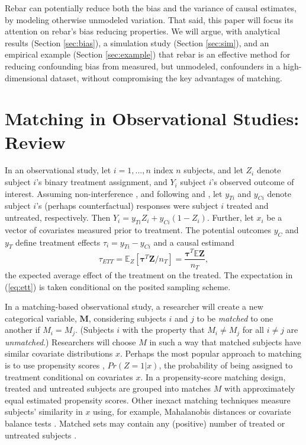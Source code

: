 \documentclass[12pt]{article}\usepackage[]{graphicx}\usepackage[]{color}
\newcommand{\yci}{y_{Ci}}
\newcommand{\yti}{y_{Ti}}
\newcommand{\EE}{\mathbb{E}}
\newcommand{\Match}{M}
\newcommand{\covVec}{x}
\begin{document}
Rebar can potentially reduce both the bias and the variance of causal estimates, by modeling otherwise unmodeled variation.
That said, this paper will focus its attention on rebar's bias reducing properties.
We will argue, with analytical results (Section \ref{sec:bias}), a simulation study (Section \ref{sec:sim}), and an empirical example (Section \ref{sec:example}) that rebar is an effective method for reducing confounding bias from measured, but unmodeled, confounders in a high-dimensional dataset, without compromising the key advantages of matching.



\section{Matching in Observational Studies: Review}\label{sec:matchingReview}

In an observational study, let $i=1,...,n$ index $n$ subjects, and let $Z_i$ denote subject $i$'s binary treatment assignment, and $Y_i$ subject $i$'s observed outcome of interest.
Assuming non-interference \citep{cox:1958}, and following \citet{neyman:1990} and \citet{rubin:1974}, let $y_{Ti}$ and $y_{Ci}$ denote subject $i$'s (perhaps counterfactual) responses were subject $i$ treated and untreated, respectively.
Then $Y_i=y_{Ti}Z_i+y_{Ci}(1-Z_i)$.
Further, let $\covVec_i$ be a vector of covariates measured prior to treatment.
The potential outcomes $y_C$ and $y_T$ define treatment effects $\tau_i=\yti-\yci$ and a causal estimand
\begin{equation}\label{eq:ett}
\tau_{ETT}=\EE_Z[\bm{\tau}^T\bm{Z}/n_T]=\frac{\bm{\tau}^T\EE\bm{Z}}{n_T},
\end{equation}
the expected average effect of the treatment on the treated.
The expectation in (\ref{eq:ett}) is taken conditional on the posited sampling scheme.

In a matching-based observational study, a researcher will create a
new categorical variable, $\mathbf{\Match}$, considering subjects $i$
and $j$ to be \emph{matched} %
to one another if $\Match_i=\Match_j$.
(Subjects $i$ with the property that $M_i \neq M_j$ for all $i\neq j$ are \textit{unmatched}.)
Researchers will choose $\Match$ in such a way that matched subjects
have similar covariate distributions $\covVec$.
Perhaps the most popular approach to matching is to use propensity scores \citep{rosenbaum1983central},
$Pr(Z=1|\covVec)$, the probability of
being assigned to treatment conditional on covariates $\covVec$.
In a propensity-score matching design, treated and untreated subjects
are grouped into matches $\Match$ with approximately equal
estimated propensity scores.
Other inexact matching techniques measure subjects' similarity in
$\covVec$ using, for example, Mahalanobis distances \citep{rubin1980bias}
or covariate balance tests \citep{diamond2013genetic}.
Matched sets may contain any (positive) number of treated or untreated
subjects \citep{rosenbaum:1991a}.
\end{document}
